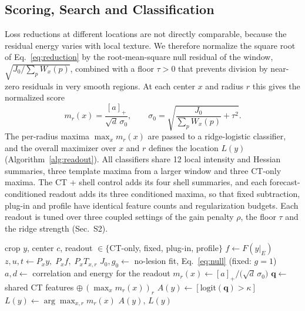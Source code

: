 \subsection{Scoring, Search and Classification}
\label{sec:score}
Loss reductions at different locations are not directly comparable, because the residual energy varies with local texture. We therefore normalize the square root of Eq.~\eqref{eq:reduction} by the root-mean-square null residual of the window, $\sqrt{J_0/\sum_pW_x(p)}$, combined with a floor $\tau>0$ that prevents division by near-zero residuals in very smooth regions. At each center $x$ and radius $r$ this gives the normalized score
\begin{equation}
m_r(x)=\frac{[a]_+}{\sqrt{d}\,\sigma_0},\qquad \sigma_0=\sqrt{\frac{J_0}{\sum_p W_x(p)}+\tau^2}.
\label{eq:score}
\end{equation} The per-radius maxima $\max_x m_r(x)$ are passed to a ridge-logistic classifier, and the overall maximizer over $x$ and $r$ defines the location $L(y)$ (Algorithm~\ref{alg:readout}). All classifiers share 12 local intensity and Hessian summaries, three template maxima from a larger window and three CT-only maxima. The CT + shell control adds its four shell summaries, and each forecast-conditioned readout adds its three conditioned maxima, so that fixed subtraction, plug-in and profile have identical feature counts and regularization budgets. Each readout is tuned over three coupled settings of the gain penalty $\rho$, the floor $\tau$ and the ridge strength (Sec.~S2).

\begin{algorithm}[t]
\caption{Forecast-conditioned candidate scoring}
\label{alg:readout}
\begin{algorithmic}[1]
\small
\Require crop $y$, center $c$, readout $\in\{$CT-only, fixed, plug-in, profile$\}$
\State $f\gets F(y|_E)$ 
  \State $z,u,t\gets P_x y,\;P_x f,\;P_x T_{x,r}$ 
  \State $J_0,g_0\gets$ no-lesion fit, Eq.~\eqref{eq:null} (fixed: $g=1$)
  \State $a,d\gets$ correlation and energy for the readout
  \State $m_r(x)\gets [a]_+\big/\big(\sqrt{d}\,\sigma_0\big)$ 
\EndFor
\State $\mathbf{q}\gets$ shared CT features $\oplus\,(\max_x m_r(x))_r$
\State $A(y)\gets[\mathrm{logit}(\mathbf{q})>\kappa]$ 
\State $L(y)\gets\arg\max_{x,r} m_r(x)$
\State \Return $A(y),\,L(y)$
\end{algorithmic}
\end{algorithm}

